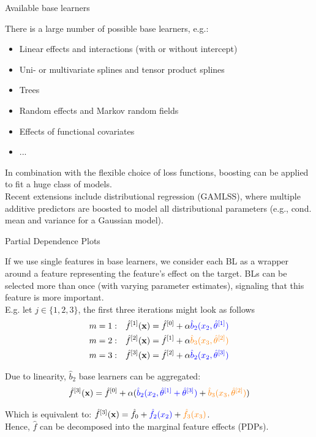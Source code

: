 \documentclass[11pt,compress,t,notes=noshow, xcolor=table]{beamer}
\begin{document}
\begin{vbframe}{Available base learners}

There is a large number of possible base learners, e.g.:

\begin{itemize}
  \item Linear effects and interactions (with or without intercept)
  \item Uni- or multivariate splines and tensor product splines
  \item Trees
  \item Random effects and Markov random fields
  \item Effects of functional covariates
  \item ...
\end{itemize}

\lz

In combination with the flexible choice of loss functions, boosting can be applied to fit a huge class of models.\\ 
\vspace{0.1cm}
Recent extensions include distributional regression (GAMLSS), where multiple additive predictors are boosted to model all distributional parameters (e.g., cond. mean and variance for a Gaussian model).

\end{vbframe}
\begin{vbframe}{Partial Dependence Plots }

If we use single features in base learners, we consider each BL as a wrapper around a feature representing the feature's effect on the target. BLs can be selected more than once (with varying parameter estimates), signaling that this feature is more important.\\
E.g. let $j \in \{ 1,2,3 \}$, the first three iterations might look as follows
\begin{align*}
m = 1: \quad & \hat{f}^{[1]}(\mathbf{x}) = \hat{f}^{[0]} + \alpha \textcolor{blue}{\hat{b}_2(x_2, \hat{\theta}^{[1]})}\\
m = 2: \quad & \hat{f}^{[2]}(\mathbf{x}) = \hat{f}^{[1]} + \alpha  \textcolor{orange}{\hat{b}_3(x_3, \hat{\theta}^{[2]})}\\
m = 3: \quad & \hat{f}^{[3]}(\mathbf{x}) = \hat{f}^{[2]} + \alpha \textcolor{blue}{\hat{b}_2(x_2, \hat{\theta}^{[3]})}
\end{align*}

Due to linearity, $\hat{b}_2$ base learners can be aggregated:
$$
\hat{f}^{[3]}(\mathbf{x}) = \hat{f}^{[0]} + \alpha (\textcolor{blue}{\hat{b}_2(x_2, \hat{\theta}^{[1]} + \hat{\theta}^{[3]})} + \textcolor{orange}{\hat{b}_3(x_3, \hat{\theta}^{[2]})})
$$

Which is equivalent to:
$\hat{f}^{[3]}(\mathbf{x}) = \hat{f}_0 + \textcolor{blue}{\hat{f}_2(x_2)} + \textcolor{orange}{\hat{f}_3(x_3)}$.\\
Hence, $\hat{f}$ can be decomposed into the marginal feature effects (PDPs).



\end{vbframe}
\end{document}
